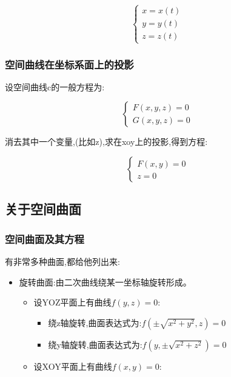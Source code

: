 \documentclass[UTF8]{ctexbook}
\newcommand{\defFunction}[1]{f(#1)}
\begin{document}
{{{{\begin{enumerate}
{              $$
                \begin{cases}
                  x = x(t) \\
                  y = y(t) \\
                  z = z(t)
                \end{cases}
              $$
              }
      \end{enumerate}
    }%

    \subsubsection{空间曲线在坐标系面上的投影}{

      设空间曲线c的一般方程为:

      $$
        \begin{cases}
          F(x,y,z) = 0 \\
          G(x,y,z) = 0
        \end{cases}
      $$

      消去其中一个变量,(比如z),求在xoy上的投影,得到方程:

      $$
        \begin{cases}
          F(x,y) = 0 \\
          z = 0
        \end{cases}
      $$
    }%

  }%

  \subsection{关于空间曲面}{

    \subsubsection{空间曲面及其方程}{
      有非常多种曲面,都给他列出来:

      \begin{itemize}
        \item {
              旋转曲面:由二次曲线绕某一坐标轴旋转形成。

              \begin{itemize}
                \item {
                      设YOZ平面上有曲线$\defFunction{y,z} = 0$:

                      \begin{itemize}
                        \item 绕z轴旋转,曲面表达式为:$\defFunction{\pm\sqrt{x^2 + y^2},z} = 0$
                        \item 绕y轴旋转,曲面表达式为:$\defFunction{y,\pm\sqrt{x^2 + z^2}} = 0$
                      \end{itemize}
                      }
                \item {
                      设XOY平面上有曲线$\defFunction{x,y} = 0$:

}
\end{itemize}}
\end{itemize}}}}}
\end{document}
